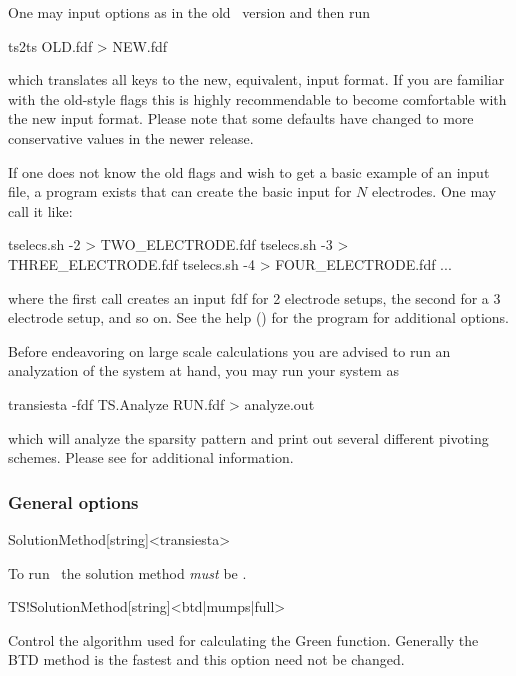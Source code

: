 %
One may input options as in the old \tsiesta\ version and then run
\begin{fdfexample}
  ts2ts OLD.fdf > NEW.fdf
\end{fdfexample}
which translates all keys to the new, equivalent, input format. If you
are familiar with the old-style flags this is highly recommendable to
become comfortable with the new input format. Please note that some
defaults have changed to more conservative values in the newer
release. 

If one does not know the old flags and wish to get a basic example of
an input file, a program  exists that can
create the basic input for $N$ electrodes. One may call it like:
\begin{fdfexample}
  tselecs.sh -2 > TWO_ELECTRODE.fdf
  tselecs.sh -3 > THREE_ELECTRODE.fdf
  tselecs.sh -4 > FOUR_ELECTRODE.fdf
  ...
\end{fdfexample}
where the first call creates an input fdf for 2 electrode setups, the
second for a 3 electrode setup, and so on. See the help ()
for the program for additional options.

Before endeavoring on large scale calculations you are advised to run
an analyzation of the system at hand, you may run your system as
\begin{shellexample}
  transiesta -fdf TS.Analyze RUN.fdf > analyze.out
\end{shellexample}
which will analyze the sparsity pattern and print out several
different pivoting schemes. Please see  for additional
information. 


\subsubsection{General options}

\begin{fdfentry}{SolutionMethod}[string]<transiesta>

  To run \tsiesta\ the solution method \emph{must} be
  .

\end{fdfentry}

\begin{fdfentry}{TS!SolutionMethod}[string]<btd|mumps|full>

  Control the algorithm used for calculating the Green
  function. Generally the BTD method is the fastest and this option
  need not be changed.
  
\end{fdfentry}

